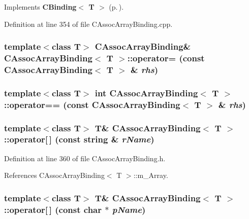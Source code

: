 Implements {\bf CBinding$<$ T $>$} {\rm (p.\,\pageref{classCBinding_a0})}.

Definition at line 354 of file CAssoc\-Array\-Binding.cpp.
\subsubsection{\setlength{\rightskip}{0pt plus 5cm}template$<$class T$>$ CAssoc\-Array\-Binding\& CAssoc\-Array\-Binding$<$ T $>$::operator= (const CAssoc\-Array\-Binding$<$ T $>$ \& {\em rhs})\hspace{0.3cm}{\tt  [private]}}\label{classCAssocArrayBinding_c1}


\subsubsection{\setlength{\rightskip}{0pt plus 5cm}template$<$class T$>$ int CAssoc\-Array\-Binding$<$ T $>$::operator== (const CAssoc\-Array\-Binding$<$ T $>$ \& {\em rhs})\hspace{0.3cm}{\tt  [private]}}\label{classCAssocArrayBinding_c2}


\subsubsection{\setlength{\rightskip}{0pt plus 5cm}template$<$class T$>$ T\& CAssoc\-Array\-Binding$<$ T $>$::operator[$\,$] (const string \& {\em r\-Name})\hspace{0.3cm}{\tt  [inline]}}\label{classCAssocArrayBinding_a7}




Definition at line 360 of file CAssoc\-Array\-Binding.h.

References CAssoc\-Array\-Binding$<$ T $>$::m\_\-Array.
\subsubsection{\setlength{\rightskip}{0pt plus 5cm}template$<$class T$>$ T\& CAssoc\-Array\-Binding$<$ T $>$::operator[$\,$] (const char $\ast$ {\em p\-Name})\hspace{0.3cm}{\tt  [inline]}}\label{classCAssocArrayBinding_a6}




